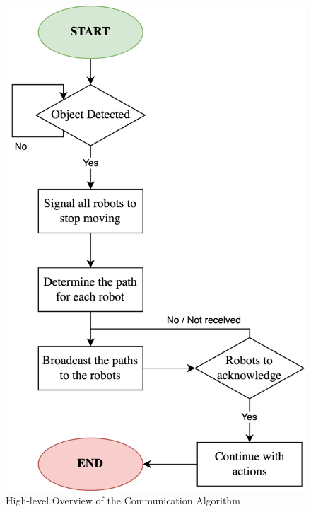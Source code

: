 \begin{figure} [H]
    \centering
    \includegraphics[width=0.5\linewidth]{assets/images/communication/communication-diagram.png}
    \caption{High-level Overview of the Communication Algorithm}
    \label{fig:communication-diagram}
\end{figure}
